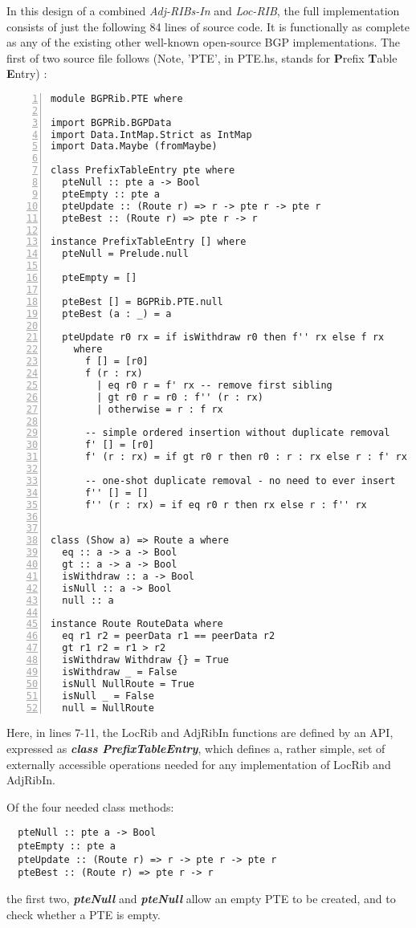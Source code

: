 In this design of a combined \textit{Adj-RIBs-In} and \textit{Loc-RIB}, the full implementation consists of just the following 84 lines of source code.  It is functionally as complete as any of the existing other well-known open-source BGP implementations. The first of two source file follows (Note, 'PTE', in PTE.hs, stands for \textbf{P}refix \textbf{T}able \textbf{E}ntry) :

\begin{lstlisting}[title=BGPRib/PTE.hs, numbers = left]
module BGPRib.PTE where

import BGPRib.BGPData
import Data.IntMap.Strict as IntMap
import Data.Maybe (fromMaybe)

class PrefixTableEntry pte where
  pteNull :: pte a -> Bool
  pteEmpty :: pte a
  pteUpdate :: (Route r) => r -> pte r -> pte r
  pteBest :: (Route r) => pte r -> r

instance PrefixTableEntry [] where
  pteNull = Prelude.null

  pteEmpty = []

  pteBest [] = BGPRib.PTE.null
  pteBest (a : _) = a

  pteUpdate r0 rx = if isWithdraw r0 then f'' rx else f rx
    where
      f [] = [r0]
      f (r : rx)
        | eq r0 r = f' rx -- remove first sibling
        | gt r0 r = r0 : f'' (r : rx)
        | otherwise = r : f rx

      -- simple ordered insertion without duplicate removal
      f' [] = [r0]
      f' (r : rx) = if gt r0 r then r0 : r : rx else r : f' rx

      -- one-shot duplicate removal - no need to ever insert
      f'' [] = []
      f'' (r : rx) = if eq r0 r then rx else r : f'' rx


class (Show a) => Route a where
  eq :: a -> a -> Bool
  gt :: a -> a -> Bool
  isWithdraw :: a -> Bool
  isNull :: a -> Bool
  null :: a

instance Route RouteData where
  eq r1 r2 = peerData r1 == peerData r2
  gt r1 r2 = r1 > r2
  isWithdraw Withdraw {} = True
  isWithdraw _ = False
  isNull NullRoute = True
  isNull _ = False
  null = NullRoute
\end{lstlisting}

Here, in lines 7-11, the LocRib and AdjRibIn functions are defined by an API, expressed as \textbf{\textit{class PrefixTableEntry}}, which defines a, rather simple, set of externally accessible operations needed for any implementation of LocRib and AdjRibIn.

Of the four needed class methods:
\begin{verbatim}    
  pteNull :: pte a -> Bool
  pteEmpty :: pte a
  pteUpdate :: (Route r) => r -> pte r -> pte r
  pteBest :: (Route r) => pte r -> r
\end{verbatim}
the first two,  \textbf{\textit{pteNull}} and  \textbf{\textit{pteNull}} allow an empty PTE to be created, and to check whether a PTE is empty.

